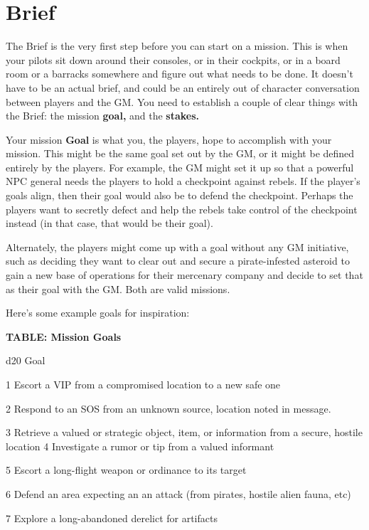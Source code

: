 \section{Brief}

The Brief is the very first step before you can start on a mission. This is when your pilots sit down around their consoles, or in their cockpits, or in a board room or a barracks somewhere and figure out what needs to be done. It doesn't have to be an actual brief, and could be an entirely out of character conversation between players and the GM. You need to establish a couple of clear things with the Brief: the mission \textbf{goal,} and the \textbf{stakes.} 

Your mission \textbf{Goal} is what you, the players, hope to accomplish with your mission. This might be
the same goal set out by the GM, or it might be defined entirely by the players. For example, the
GM might set it up so that a powerful NPC general needs the players to hold a checkpoint
against rebels. If the player's goals align, then their goal would also be to defend the checkpoint.
Perhaps the players want to secretly defect and help the rebels take control of the checkpoint
instead (in that case, that would be their goal).

Alternately, the players might come up with a goal without any GM initiative, such as deciding
they want to clear out and secure a pirate-infested asteroid to gain a new base of operations for
their mercenary company and decide to set that as their goal with the GM. Both are valid
missions.

Here's some example goals for inspiration:

\textbf{TABLE: Mission Goals}

 d20       Goal

 1         Escort a VIP from a compromised location to a new safe one

 2         Respond to an SOS from an unknown source, location noted in message.

 3         Retrieve a valued or strategic object, item, or information from a secure, hostile
           location
 4         Investigate a rumor or tip from a valued informant

 5         Escort a long-flight weapon or ordinance to its target

 6         Defend an area expecting an an attack (from pirates, hostile alien fauna, etc)

 7         Explore a long-abandoned derelict for artifacts

